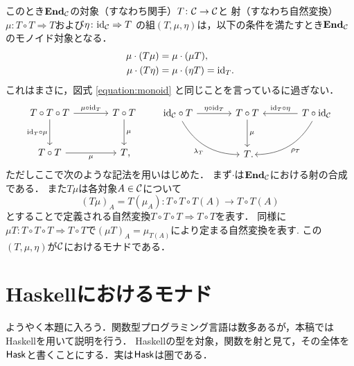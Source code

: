 \documentclass[uplatex,a4paper,dvipdfmx]{jsarticle}
\begin{document}
このとき${\mathord{\mathbf{End}}}_{\mathcal{C}}$の対象（すなわち関手）$T \colon {\mathcal{C}} \to {\mathcal{C}}$と
射（すなわち自然変換）$\mu \colon T \circ T \Rightarrow T$および$\eta \colon \mathrm{id}_{\mathcal{C}} \Rightarrow T$
の組$(T, \mu, \eta)$は，以下の条件を満たすとき${\mathord{\mathbf{End}}}_{\mathcal{C}}$のモノイド対象となる．
\begin{align*}
    \mu \cdot (T\mu) &= \mu \cdot (\mu T), \\
    \mu \cdot (T\eta) &= \mu \cdot (\eta T) = \mathrm{id}_T.
\end{align*}
これはまさに，図式 \ref{equation:monoid} と同じことを言っているに過ぎない．
\begin{equation*}
    \begin{tikzcd}[sep=large]
        T \circ T \circ T \arrow[r, "\mu \circ \id_T"] \arrow[d, "\id_T \circ \mu"'] & T \circ T \arrow[d, "\mu"] \\
        T \circ T \arrow[r, "\mu"'] & T\rlap{,}
    \end{tikzcd}
    \qquad
    \begin{tikzcd}[sep=large]
        \id_\Ccal \circ T \arrow[r, "\eta \circ \id_T"] \arrow[rd, bend right, "\lambda_T"' name=X]
                        & T \circ T \arrow[d, "\mu"] 
                        & \arrow[l, "\id_T \circ \eta"'] T \circ \id_\Ccal \arrow[ld, bend left, "\rho_T" name=Y] \\
                        & T\rlap{.}
    \end{tikzcd}
\end{equation*}
ただしここで次のような記法を用いはじめた．
まず$\cdot$は${\mathord{\mathbf{End}}}_{\mathcal{C}}$における射の合成である．
また$T \mu$は各対象$A \in {\mathcal{C}}$について
\begin{equation*}
    (T \mu)_A = T(\mu_A) \colon T \circ T \circ T(A) \to T \circ T(A)
\end{equation*}
とすることで定義される自然変換$T \circ T \circ T \Rightarrow T \circ T$を表す．
同様に $\mu T \colon T \circ T \circ T \Rightarrow T \circ T$で$(\mu T)_A = \mu_{T(A)}$により定まる自然変換を表す.
この$(T, \mu, \eta)$が${\mathcal{C}}$におけるモナドである．

\section{Haskellにおけるモナド}

ようやく本題に入ろう．関数型プログラミング言語は数多あるが，本稿ではHaskellを用いて説明を行う．
Haskellの型を対象，関数を射と見て，その全体を$\mathsf{Hask}$と書くことにする．実は$\mathsf{Hask}$は圏である．

\begin{remarks}
\end{remarks}
\end{document}
